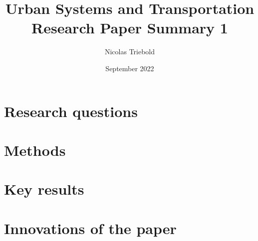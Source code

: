 \documentclass{report}
\title{Urban Systems and Transportation \\ Research Paper Summary 1}
\author{Nicolas Triebold}
\date{September 2022}
\begin{document}
\maketitle

\section{Research questions}

\section{Methods}

\section{Key results}

\section{Innovations of the paper}
\end{document}
